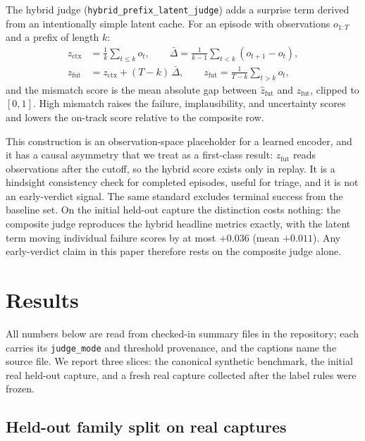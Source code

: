\documentclass[11pt]{article}
\newcommand{\judgemode}[1]{\texttt{#1}}
\begin{document}
The hybrid judge (\judgemode{hybrid\_prefix\_latent\_judge}) adds a surprise term derived
from an intentionally simple latent cache. For an episode with observations
$o_{1:T}$ and a prefix of length $k$:
\begin{align*}
z_{\text{ctx}} &= \tfrac{1}{k}\textstyle\sum_{t \le k} o_t, \qquad
\bar{\Delta} = \tfrac{1}{k-1}\textstyle\sum_{t < k} (o_{t+1} - o_t),\\
\hat{z}_{\text{fut}} &= z_{\text{ctx}} + (T - k)\,\bar{\Delta}, \qquad
z_{\text{fut}} = \tfrac{1}{T-k}\textstyle\sum_{t > k} o_t,
\end{align*}
and the mismatch score is the mean absolute gap between $\hat{z}_{\text{fut}}$ and
$z_{\text{fut}}$, clipped to $[0,1]$. High mismatch raises the failure, implausibility, and
uncertainty scores and lowers the on-track score relative to the composite row.

This construction is an observation-space placeholder for a learned encoder, and it has a
causal asymmetry that we treat as a first-class result: $z_{\text{fut}}$ reads observations
after the cutoff, so the hybrid score exists only in replay. It is a hindsight consistency
check for completed episodes, useful for triage, and it is not an early-verdict signal. The
same standard excludes terminal success from the baseline set. On the initial held-out
capture the distinction costs nothing: the composite judge reproduces the hybrid headline
metrics exactly, with the latent term moving individual failure scores by at most $+0.036$
(mean $+0.011$). Any early-verdict claim in this paper therefore rests on the composite
judge alone.

\section{Results}
\label{sec:results}

All numbers below are read from checked-in summary files in the repository; each carries its
\judgemode{judge\_mode} and threshold provenance, and the captions name the source file. We
report three slices: the canonical synthetic benchmark, the initial real held-out capture,
and a fresh real capture collected after the label rules were frozen.

\subsection{Held-out family split on real captures}
\label{sec:heldout}
\end{document}
